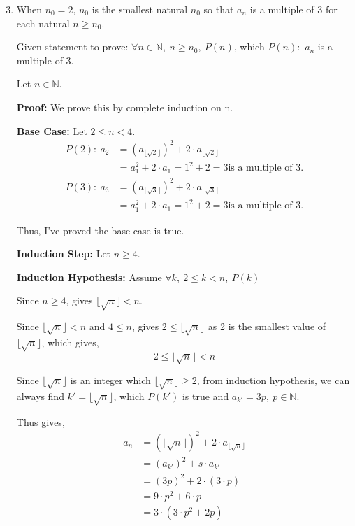 \documentclass[12pt]{article}
\begin{document}
\begin{enumerate}[label=(\alph*)]
\setcounter{enumi}{2}
    \item When $n_0 = 2$, $n_0$ is the smallest natural $n_0$ so that $a_n$ is a multiple of 3 for each natural $ n \geq n_0$.
    
    Given statement to prove: $\forall n \in \mathbb{N},\ n \geq n_0,\ P(n)$, which $P(n):$ $a_n$ is a multiple of 3.

    Let $n \in \mathbb{N}$.

    \textbf{Proof:} We prove this by complete induction on n.

    \textbf{Base Case:} Let $2 \leq n < 4$.
    \begin{align*}
        P(2):\ a_2 &= (a_{\lfloor \sqrt{2} \rfloor})^2 + 2 \cdot a_{\lfloor \sqrt{2} \rfloor} \\
        &= a_1^2 + 2 \cdot a_1 = 1^2 + 2 = 3 \text{is a multiple of 3}.
    \end{align*}
    \begin{align*}
        P(3):\ a_3 &= (a_{\lfloor \sqrt{3} \rfloor})^2 + 2 \cdot a_{\lfloor \sqrt{3} \rfloor} \\
        &= a_1^2 + 2 \cdot a_1 = 1^2 + 2 = 3 \text{is a multiple of 3}.
    \end{align*}

    Thus, I've proved the base case is true.

    \textbf{Induction Step:} Let $n \geq 4$.

    \textbf{Induction Hypothesis:} Assume $\forall k,\ 2\leq k < n,\ P(k)$

    Since $n \geq 4$, gives $\lfloor \sqrt{n} \rfloor < n$.

    Since $\lfloor \sqrt{n} \rfloor < n$ and $4 \leq n$, gives $2 \leq \lfloor \sqrt{n} \rfloor$ as 2 is the smallest value of $\lfloor \sqrt{n} \rfloor$, which gives, $$2 \leq \lfloor \sqrt{n} \rfloor < n $$

    Since $\lfloor \sqrt{n} \rfloor$ is an integer which $\lfloor \sqrt{n} \rfloor \geq 2$, from induction hypothesis, we can always find $k' = \lfloor \sqrt{n} \rfloor$, which $P(k')$ is true and $a_{k'} = 3p,\ p \in \mathbb{N}$.

    Thus gives,
    \begin{align*}
        a_n &= (\lfloor \sqrt{n} \rfloor)^2 + 2\cdot a_{\lfloor \sqrt{n} \rfloor} \\
        &= (a_{k'})^2 + s\cdot a_{k'} \\
        &= (3p)^2 + 2 \cdot (3 \cdot p) \\
        &= 9 \cdot p^2 + 6 \cdot p \\
        &= 3 \cdot (3\cdot p^2 + 2p)
    \end{align*}


\end{enumerate}
\end{document}
